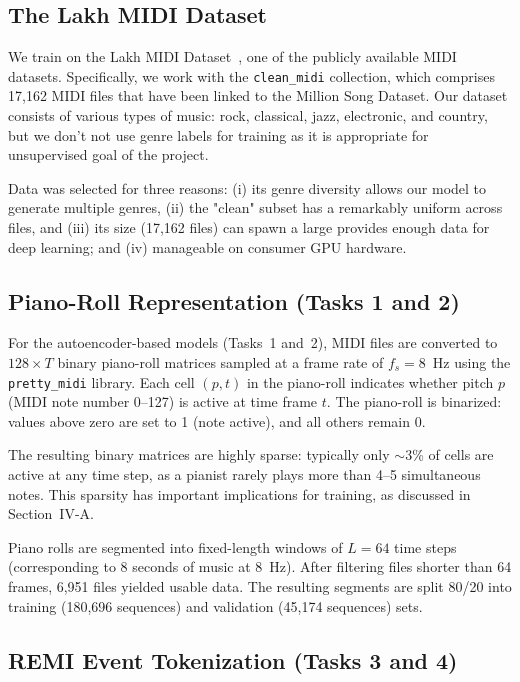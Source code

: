 \documentclass[conference]{IEEEtran}
\begin{document}
\subsection{The Lakh MIDI Dataset}

We train on the Lakh MIDI Dataset~\cite{raffel2016}, one of the
publicly available MIDI datasets. Specifically, we
work with the \texttt{clean\_midi} collection, which comprises 17,162 MIDI files that have been linked to the Million Song Dataset. Our dataset consists of various types of music:
rock, classical, jazz, electronic, and country, but we don't not use genre labels for training as it is appropriate for unsupervised goal of the project.

Data was selected for three reasons: (i) its genre
diversity allows our model to generate multiple genres, (ii) the "clean" subset has a remarkably uniform
across files, and (iii) its size (17,162 files) can spawn a large
provides enough data for deep learning; and (iv)
manageable on consumer GPU hardware.
\subsection{Piano-Roll Representation (Tasks 1 and 2)}

For the autoencoder-based models (Tasks~1 and~2), MIDI files are converted to $128 \times T$ binary piano-roll matrices sampled at a frame rate of $f_s = 8$~Hz using the \texttt{pretty\_midi} library. Each cell $(p, t)$ in the piano-roll indicates whether pitch $p$ (MIDI note number 0--127) is active at time frame $t$. The piano-roll is binarized: values above zero are set to 1 (note active), and all others remain 0.

The resulting binary matrices are highly sparse: typically only $\sim$3\% of cells are active at any time step, as a pianist rarely plays more than 4--5 simultaneous notes. This sparsity has important implications for training, as discussed in Section~IV-A.

Piano rolls are segmented into fixed-length windows of $L = 64$ time steps (corresponding to 8 seconds of music at 8~Hz). After filtering files shorter than 64 frames, 6,951 files yielded usable data. The resulting segments are split 80/20 into training (180,696 sequences) and validation (45,174 sequences) sets.

\subsection{REMI Event Tokenization (Tasks 3 and 4)}
\end{document}
